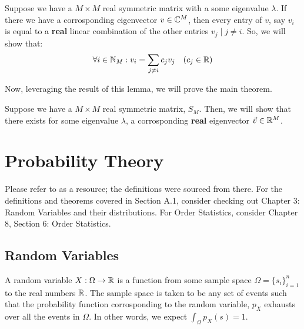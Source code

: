  Suppose we have a $M \times M$ real symmetric matrix with a some eigenvalue $\lambda$. If there we have a corrosponding eigenvector $v \in \mathbb{C}^M$, then every entry of $v$, say $v_i$ is equal to a \textbf{real} linear combination of the other entries $v_j \mid j \neq i$. So, we will show that:
$$\forall i \in \mathbb{N}_{M}: v_i =  {\sum_{j \neq i} c_j v_j} \quad (c_j \in \mathbb{R})$$

\lemmaproof \newline


\noindent Now, leveraging the result of this lemma, we will prove the main theorem.

\begin{theorem}[Taqi] Suppose we have a $M \times M$ real symmetric matrix, $S_M$. Then, we will show that there exists for some eigenvalue $\lambda$, a corrosponding \textbf{real} eigenvector $\vec{v} \in \mathbb{R}^M$.
\end{theorem}

\taqiproof

\newpage
\section{Probability Theory}

Please refer to \cite{blitz} as a resource; the definitions were sourced from there. For the definitions and theorems covered in Section A.1, consider checking out Chapter 3: Random Variables and their distributions. For Order Statistics, consider Chapter 8, Section 6: Order Statistics.

\subsection{Random Variables}

\begin{definition}
A random variable $X: \Omega \to \mathbb{R}$ is a function from some sample space $\Omega = \{s_i\}_{i=1}^n$ to the real numbers $\mathbb{R}$. The sample space is taken to be any set of events such that the probability function corrosponding to the random variable, $p_X$ exhausts over all the events in $\Omega$. In other words, we expect $\int_\Omega p_X(s) = 1$.
\end{definition}

